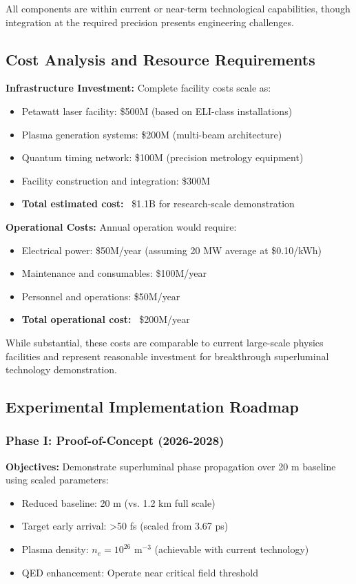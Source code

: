 \documentclass[aps,prl,reprint,groupedaddress,floatfix]{revtex4-1}
\begin{document}
All components are within current or near-term technological capabilities, though integration at the required precision presents engineering challenges.

\subsection{Cost Analysis and Resource Requirements}

\textbf{Infrastructure Investment:} Complete facility costs scale as:
\begin{itemize}
    \item Petawatt laser facility: \$500M (based on ELI-class installations)
    \item Plasma generation systems: \$200M (multi-beam architecture)
    \item Quantum timing network: \$100M (precision metrology equipment)
    \item Facility construction and integration: \$300M
    \item \textbf{Total estimated cost:} ~\$1.1B for research-scale demonstration
\end{itemize}

\textbf{Operational Costs:} Annual operation would require:
\begin{itemize}
    \item Electrical power: \$50M/year (assuming 20 MW average at \$0.10/kWh)
    \item Maintenance and consumables: \$100M/year
    \item Personnel and operations: \$50M/year
    \item \textbf{Total operational cost:} ~\$200M/year
\end{itemize}

While substantial, these costs are comparable to current large-scale physics facilities and represent reasonable investment for breakthrough superluminal technology demonstration.

\subsection{Experimental Implementation Roadmap}

\subsubsection{Phase I: Proof-of-Concept (2026-2028)}

\textbf{Objectives:} Demonstrate superluminal phase propagation over 20 m baseline using scaled parameters:
\begin{itemize}
    \item Reduced baseline: 20 m (vs. 1.2 km full scale)
    \item Target early arrival: >50 fs (scaled from 3.67 ps)
    \item Plasma density: $n_e = 10^{26}$ m$^{-3}$ (achievable with current technology)
    \item QED enhancement: Operate near critical field threshold
\end{itemize}
\end{document}
